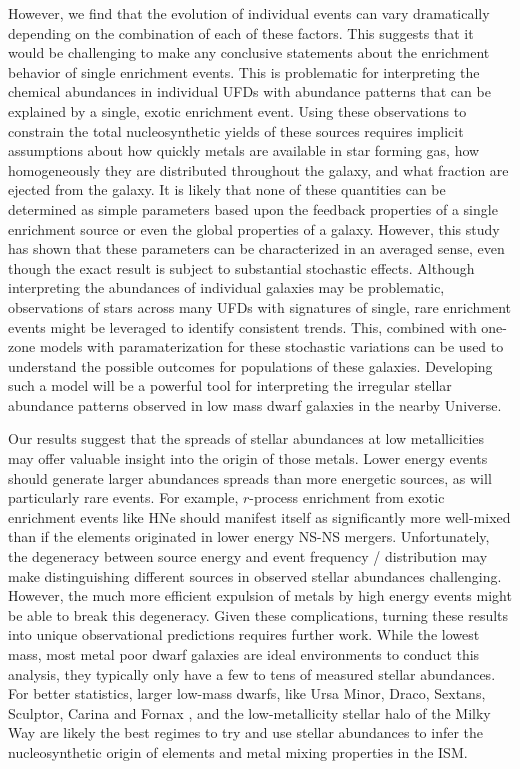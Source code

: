 \documentclass[twocolumn]{aastex62}
\begin{document}
 However, we find that the evolution of individual events can vary dramatically depending on the combination of each of these factors. This suggests that it would be challenging to make any conclusive statements about the enrichment behavior of single enrichment events. This is problematic for interpreting the chemical abundances in individual UFDs with abundance patterns that can be explained by a single, exotic enrichment event. Using these observations to constrain the total nucleosynthetic yields of these sources requires implicit assumptions about how quickly metals are available in star forming gas, how homogeneously they are distributed throughout the galaxy, and what fraction are ejected from the galaxy. It is likely that none of these quantities can be determined as simple parameters based upon the feedback properties of a single enrichment source or even the global properties of a galaxy. However, this study has shown that these parameters can be characterized in an averaged sense, even though the exact result is subject to substantial stochastic effects. Although interpreting the abundances of individual galaxies may be problematic, observations of stars across many UFDs with signatures of single, rare enrichment events might be leveraged to identify consistent trends. This, combined with one-zone models with paramaterization for these stochastic variations can be used to understand the possible outcomes for populations of these galaxies. Developing such a model will be a powerful tool for interpreting the irregular stellar abundance patterns observed in low mass dwarf galaxies in the nearby Universe.

Our results suggest that the spreads of stellar abundances at low metallicities may offer valuable insight into the origin of those metals. Lower energy events should generate larger abundances spreads than more energetic sources, as will particularly rare events. For example, $r$-process enrichment from exotic enrichment events like HNe should manifest itself as significantly more well-mixed than if the elements originated in lower energy NS-NS mergers. Unfortunately, the degeneracy between source energy and event frequency / distribution may make distinguishing different sources in observed stellar abundances challenging. However, the much more efficient expulsion of metals by high energy events might be able to break this degeneracy. Given these complications, turning these results into unique observational predictions requires further work. While the lowest mass, most metal poor dwarf galaxies are ideal environments to conduct this analysis, they typically only have a few to tens of measured stellar abundances. For better statistics, larger low-mass dwarfs, like Ursa Minor, Draco, Sextans, Sculptor, Carina and Fornax \citep[e.g][]{Suda2017,Duggan2018,Skuladottir2019}, and the low-metallicity stellar halo of the Milky Way \citep[e.g.][]{Hansen2018,Sakari2018} are likely the best regimes to try and use stellar abundances to infer the nucleosynthetic origin of elements and metal mixing properties in the ISM.
\end{document}

